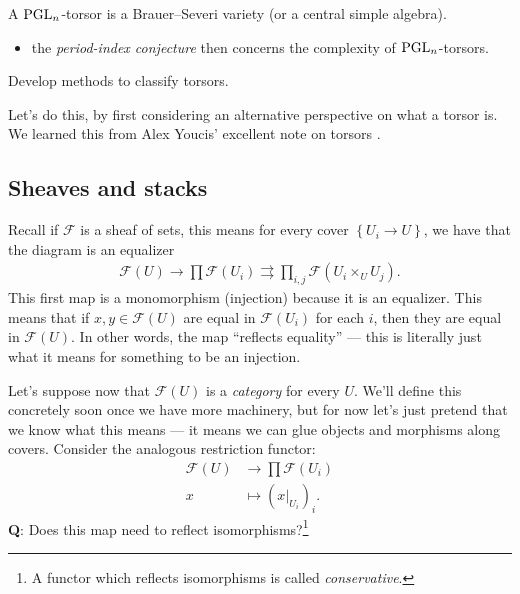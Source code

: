 \documentclass[11pt]{amsart}
\begin{document}
\begin{example} A $\mathrm{PGL}_n$-torsor is a Brauer--Severi variety (or a central simple algebra).
\end{example}
\begin{itemize}
    \item the \textit{period-index conjecture} then concerns the complexity of $\mathrm{PGL}_n$-torsors.
\end{itemize}

\begin{goal} Develop methods to classify torsors.
\end{goal}





Let's do this, by first considering an alternative perspective on what a torsor is. We learned this from Alex Youcis' excellent note on torsors \cite{Youcis}.

\subsection{Sheaves and stacks}

Recall if $\mathscr{F}$ is a sheaf of sets, this means for every cover $\left\{ U_i \to U \right\}$, we have that the diagram is an equalizer
\begin{align*}
    \mathcal{F}(U) \to \prod \mathcal{F}(U_i) \rightrightarrows \prod_{i,j} \mathcal{F}(U_i \times_U U_j).
\end{align*}
This first map is a monomorphism (injection) because it is an equalizer. This means that if $x,y \in \mathcal{F}(U)$ are equal in $\mathcal{F}(U_i)$ for each $i$, then they are equal in $\mathcal{F}(U)$. In other words, the map ``reflects equality'' --- this is literally just what it means for something to be an injection.

Let's suppose now that $\mathcal{F}(U)$ is a \textit{category} for every $U$. We'll define this concretely soon once we have more machinery, but for now let's just pretend that we know what this means --- it means we can glue objects and morphisms along covers. Consider the analogous restriction functor:
\begin{align*}
    \mathcal{F}(U) &\to \prod \mathcal{F}(U_i) \\
    x &\mapsto \left( x|_{U_i} \right)_i.
\end{align*}
%
\textbf{Q}: Does this map need to reflect isomorphisms?\footnote{A functor which reflects isomorphisms is called \textit{conservative}.}
\end{document}
